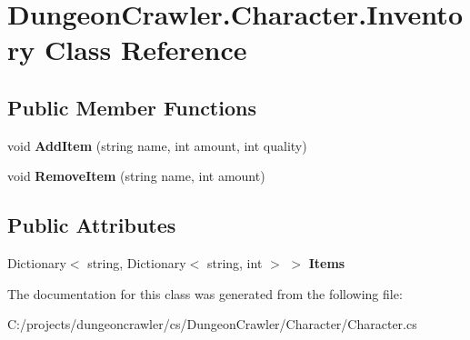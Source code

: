\hypertarget{class_dungeon_crawler_1_1_character_1_1_inventory}{}\section{Dungeon\+Crawler.\+Character.\+Inventory Class Reference}
\label{class_dungeon_crawler_1_1_character_1_1_inventory}
\subsection*{Public Member Functions}
\begin{DoxyCompactItemize}
\item 
\hypertarget{class_dungeon_crawler_1_1_character_1_1_inventory_acd9bc1f8d102f10cfbbdc384e0c5cabd}{}void {\bfseries Add\+Item} (string name, int amount, int quality)\label{class_dungeon_crawler_1_1_character_1_1_inventory_acd9bc1f8d102f10cfbbdc384e0c5cabd}

\item 
\hypertarget{class_dungeon_crawler_1_1_character_1_1_inventory_a31ff26ff2dda2eafa0c1165eacd575ba}{}void {\bfseries Remove\+Item} (string name, int amount)\label{class_dungeon_crawler_1_1_character_1_1_inventory_a31ff26ff2dda2eafa0c1165eacd575ba}

\end{DoxyCompactItemize}
\subsection*{Public Attributes}
\begin{DoxyCompactItemize}
\item 
\hypertarget{class_dungeon_crawler_1_1_character_1_1_inventory_a77ccaa8a980432d55a7b287a90eb9a23}{}Dictionary$<$ string, Dictionary$<$ string, int $>$ $>$ {\bfseries Items}\label{class_dungeon_crawler_1_1_character_1_1_inventory_a77ccaa8a980432d55a7b287a90eb9a23}

\end{DoxyCompactItemize}


The documentation for this class was generated from the following file\+:\begin{DoxyCompactItemize}
\item 
C\+:/projects/dungeoncrawler/cs/\+Dungeon\+Crawler/\+Character/Character.\+cs\end{DoxyCompactItemize}
